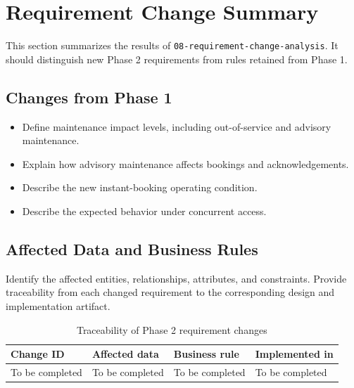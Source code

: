 \section{Requirement Change Summary}
\label{sec:requirement-changes}

This section summarizes the results of
\texttt{08-requirement-change-analysis}. It should distinguish new Phase 2
requirements from rules retained from Phase 1.

\subsection{Changes from Phase 1}
\begin{itemize}
    \item Define maintenance impact levels, including out-of-service and advisory maintenance.
    \item Explain how advisory maintenance affects bookings and acknowledgements.
    \item Describe the new instant-booking operating condition.
    \item Describe the expected behavior under concurrent access.
\end{itemize}

\subsection{Affected Data and Business Rules}
Identify the affected entities, relationships, attributes, and constraints.
Provide traceability from each changed requirement to the corresponding design
and implementation artifact.

\begin{table}[htbp]
    \centering
    \begin{tabularx}{\textwidth}{p{}X X X}
        \toprule
        \textbf{Change ID} & \textbf{Affected data} & \textbf{Business rule} & \textbf{Implemented in} \\
        \midrule
        To be completed & To be completed & To be completed & To be completed \\
        \bottomrule
    \end{tabularx}
    \caption{Traceability of Phase 2 requirement changes}
    \label{tab:requirement-change-traceability}
\end{table}